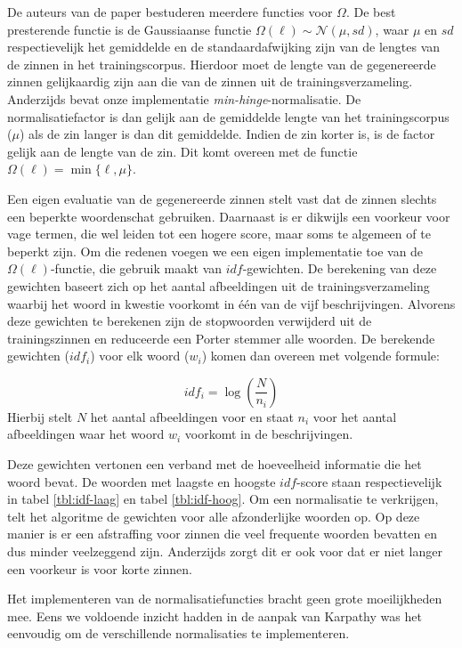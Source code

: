 De auteurs van de paper bestuderen meerdere functies voor $\Omega$. 
De best presterende functie is de Gaussiaanse functie $\Omega(\ell) \sim \mathcal{N}(\mu, sd)$, waar $\mu$ en $sd$ respectievelijk het gemiddelde en de standaardafwijking zijn van de lengtes van de zinnen in het trainingscorpus. Hierdoor moet de lengte van de gegenereerde zinnen gelijkaardig zijn aan die van de zinnen uit de trainingsverzameling. 
Anderzijds bevat onze implementatie \emph{min-hinge}-normalisatie. De normalisatiefactor is dan gelijk aan de gemiddelde lengte van het trainingscorpus ($\mu$) als de zin langer is dan dit gemiddelde. Indien de zin korter is, is de factor gelijk aan de lengte van de zin. Dit komt overeen met de functie $\Omega(\ell)=\min\{\ell, \mu\}$.

Een eigen evaluatie van de gegenereerde zinnen stelt vast dat de zinnen slechts een beperkte woordenschat gebruiken. Daarnaast is er dikwijls een voorkeur voor vage termen, die wel leiden tot een hogere score, maar soms te algemeen of te beperkt zijn.
Om die redenen voegen we een eigen implementatie toe van de $\Omega(\ell)$-functie, die gebruik maakt van $idf$-gewichten. De berekening van deze gewichten baseert zich op het aantal afbeeldingen uit de trainingsverzameling waarbij het woord in kwestie voorkomt in \'e\'en van de vijf beschrijvingen. Alvorens deze gewichten te berekenen zijn de stopwoorden verwijderd uit de trainingszinnen en reduceerde een Porter stemmer alle woorden. De berekende gewichten ($idf_i$) voor elk woord ($w_i$) komen dan overeen met volgende formule: 


\begin{equation}
    idf_i = \log(\frac{N}{n_i})
\end{equation}
Hierbij stelt $N$ het aantal afbeeldingen voor en staat $n_i$ voor het aantal afbeeldingen waar het woord $w_i$ voorkomt in de beschrijvingen.

Deze gewichten vertonen een verband met de hoeveelheid informatie die het woord bevat. De woorden met laagste en hoogste $idf$-score staan respectievelijk in tabel \ref{tbl:idf-laag} en tabel \ref{tbl:idf-hoog}. Om een normalisatie te verkrijgen, telt het algoritme de gewichten voor alle afzonderlijke woorden op. Op deze manier is er een afstraffing voor zinnen die veel frequente woorden bevatten en dus minder veelzeggend zijn. Anderzijds zorgt dit er ook voor dat er niet langer een voorkeur is voor korte zinnen.

Het implementeren van de normalisatiefuncties bracht geen grote moeilijkheden mee. Eens we voldoende inzicht hadden in de aanpak van Karpathy was het eenvoudig om de verschillende normalisaties te implementeren.


